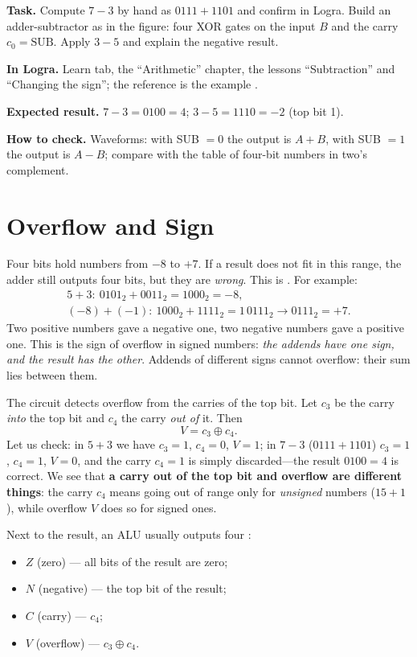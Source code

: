 \begin{diybox}[Subtraction]
\textbf{Task.}  Compute $7-3$ by hand as $0111+1101$ and confirm in
Logra.  Build an adder-subtractor as in the figure: four XOR gates on
the input $B$ and the carry $c_0=\text{SUB}$.  Apply $3-5$ and explain
the negative result.

\textbf{In Logra.} Learn tab, the ``Arithmetic'' chapter, the lessons
``Subtraction'' and ``Changing the sign''; the reference is the example
.

\textbf{Expected result.} $7-3=0100=4$; $3-5=1110=-2$ (top bit 1).

\textbf{How to check.} Waveforms: with SUB $=0$ the output is $A+B$, with
SUB $=1$ the output is $A-B$; compare with the table of four-bit numbers in
two's complement.
\end{diybox}

\section{Overflow and Sign}

Four bits hold numbers from $-8$ to $+7$. If a result does not fit in this
range, the adder still outputs four bits, but they are \emph{wrong}. This is
. For example:
\begin{gather*}
  5 + 3:\ 0101_2 + 0011_2 = 1000_2 = -8, \\
  (-8) + (-1):\ 1000_2 + 1111_2 = 1\,0111_2 \to 0111_2 = +7.
\end{gather*}
Two positive numbers gave a negative one, two negative numbers gave a positive
one. This is the sign of overflow in signed numbers: \emph{the addends have one
sign, and the result has the other}. Addends of different signs cannot overflow:
their sum lies between them.

The circuit detects overflow from the carries of the top bit. Let $c_3$ be the
carry \emph{into} the top bit and $c_4$ the carry \emph{out of} it. Then
\[
  V = c_3 \oplus c_4 .
\]
Let us check: in $5+3$ we have $c_3=1$, $c_4=0$, $V=1$; in $7-3$ ($0111+1101$)
$c_3=1$, $c_4=1$, $V=0$, and the carry $c_4=1$ is simply discarded---the result
$0100=4$ is correct. We see that \textbf{a carry out of the top bit and overflow
are different things}: the carry $c_4$ means going out of range only for
\emph{unsigned} numbers ($15+1$), while overflow $V$ does so for signed ones.

Next to the result, an ALU usually outputs four :
\begin{itemize}
  \item $Z$ (zero) --- all bits of the result are zero;
  \item $N$ (negative) --- the top bit of the result;
  \item $C$ (carry) --- $c_4$;
  \item $V$ (overflow) --- $c_3\oplus c_4$.
\end{itemize}

